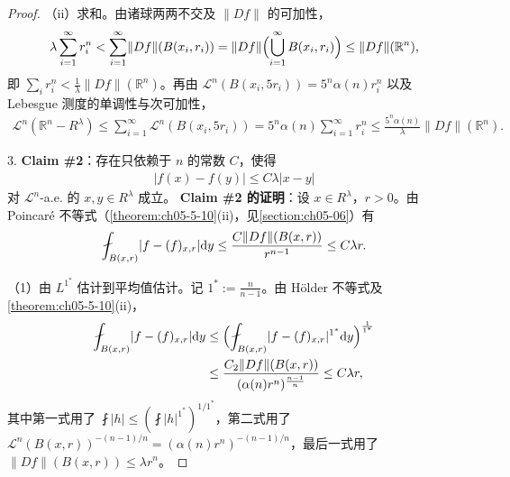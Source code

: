 \documentclass[../../main.tex]{subfiles}%
\begin{document}
\begin{proof}
（ii）求和。由诸球两两不交及 $\lVert Df\rVert$ 的可加性，
\begin{align*}
\lambda\sum_{i=1}^{\infty}r_i^n<\sum_{i=1}^{\infty}\lVert Df\rVert(B(x_i,r_i))=\lVert Df\rVert\Bigl(\bigcup_{i=1}^{\infty}B(x_i,r_i)\Bigr)\le\lVert Df\rVert(\mathbb{R}^n),
\end{align*}
即 $\sum_ir_i^n<\frac{1}{\lambda}\lVert Df\rVert(\mathbb{R}^n)$。再由 $\mathcal{L}^n(B(x_i,5r_i))=5^n\alpha(n)r_i^n$ 以及 Lebesgue 测度的单调性与次可加性，
\begin{align*}
\mathcal{L}^n(\mathbb{R}^n-R^\lambda)\le\sum_{i=1}^{\infty}\mathcal{L}^n(B(x_i,5r_i))=5^n\alpha(n)\sum_{i=1}^{\infty}r_i^n\le\frac{5^n\alpha(n)}{\lambda}\lVert Df\rVert(\mathbb{R}^n).
\end{align*}

3. \textbf{Claim \#2}：存在只依赖于 $n$ 的常数 $C$，使得
\begin{align*}
\lvert f(x)-f(y)\rvert\le C\lambda\lvert x-y\rvert
\end{align*}
对 $\mathcal{L}^n$-a.e. 的 $x,y\in R^\lambda$ 成立。
\textbf{Claim \#2 的证明}：设 $x\in R^\lambda$，$r>0$。由 Poincaré 不等式（\cref{theorem:ch05-5-10}(ii)，见\cref{section:ch05-06}）有%
\begin{align*}
\fint_{B(x,r)}\lvert f-(f)_{x,r}\rvert\diff y\le\frac{C\lVert Df\rVert(B(x,r))}{r^{n-1}}\le C\lambda r.
\end{align*}

（1）由 $L^{1^{*}}$ 估计到平均值估计。记 $1^{*}:=\frac{n}{n-1}$。由 Hölder 不等式及\cref{theorem:ch05-5-10}(ii)，%
\begin{align*}
\fint_{B(x,r)}\lvert f-(f)_{x,r}\rvert\diff y&\le\Bigl(\fint_{B(x,r)}\lvert f-(f)_{x,r}\rvert^{1^{*}}\diff y\Bigr)^{\frac{1}{1^{*}}}\\
&\le\frac{C_2\lVert Df\rVert(B(x,r))}{(\alpha(n)r^n)^{\frac{n-1}{n}}}\le C\lambda r,
\end{align*}
其中第一式用了 $\fint\lvert h\rvert\le(\fint\lvert h\rvert^{1^{*}})^{1/1^{*}}$，第二式用了 $\mathcal{L}^n(B(x,r))^{-(n-1)/n}=(\alpha(n)r^n)^{-(n-1)/n}$，最后一式用了 $\lVert Df\rVert(B(x,r))\le\lambda r^n$。


\end{proof}
\end{document}
